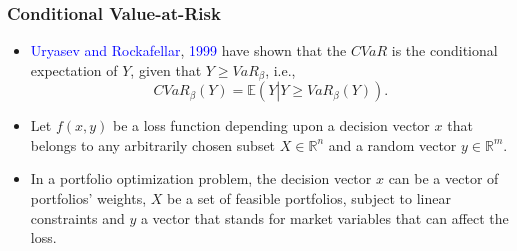 \documentclass[pdf,10pt,xcolor=dvipsnames,hide notes]{beamer}
\begin{document}
\begin{frame}[label=frame2b3]
	\frametitle{Conditional Value-at-Risk}
	\begin{itemize}
		\justifying
		
		\item \textcolor{blue}{Uryasev and Rockafellar}, \textcolor{blue}{1999} have shown that the $CVaR$ is the conditional
		expectation of $Y$, given that $Y\geq VaR_{\beta }$, i.e.,
		\begin{equation}
		CVaR_{\beta }\left( Y\right) =\mathbb{E}\left( Y\left\vert Y\geq VaR_{\beta
		}\left( Y\right) \right. \right) .  \label{three}
		\end{equation}
		
		\vspace{0.3cm}
		
		\item Let $f\left( x,y\right) $ be a loss function depending upon a decision
		vector $x$ that belongs to any arbitrarily chosen subset $X\in
		\mathbb{R}
		^{n}$ and a random vector $y\in
		\mathbb{R}
		^{m}$. 
		
			\vspace{0.3cm}
		
		\item In a portfolio optimization problem, the decision vector $x$ can be a
		vector of portfolios' weights, $X$ be a set of feasible portfolios,
		subject to linear constraints and $y$ a vector that stands for market variables that can affect the loss.
		
	\end{itemize}
	
\end{frame}
\end{document}
